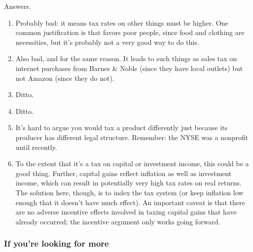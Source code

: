 \documentclass[letterpaper,12pt]{article}
\begin{document}
\begin{enumerate}
Answers.
\begin{enumerate}
\item Probably bad:
it means tax rates on other things must be higher.
One common justification is that favors poor people,
since food and clothing are necessities, but it's
probably not a very good way to do this.

\item Also bad, and for the same reason.  It leads to such
things as sales tax on internet purchases from Barnes \& Noble (since
they have local outlets) but not Amazon (since they do not).

\item Ditto.

\item Ditto.

\item It's hard to argue you would tax a product
differently just because its producer has different legal structure.
Remember:  the NYSE was a nonprofit until recently.

\item  To the extent that it's a tax on capital or investment income,
this could be a good thing.
Further, capital gains reflect inflation as well as investment income,
which can result in potentially very high tax rates on real returns.
The solution here, though, is to index the tax system
(or keep inflation low enough that it doesn't have much effect).
An important caveat is that there are no adverse incentive effects
involved in taxing capital gains that have already occurred;
the incentive argument only works going forward.

\end{enumerate}

\end{enumerate}

\subsubsection*{If you're looking for more}
\end{document}

